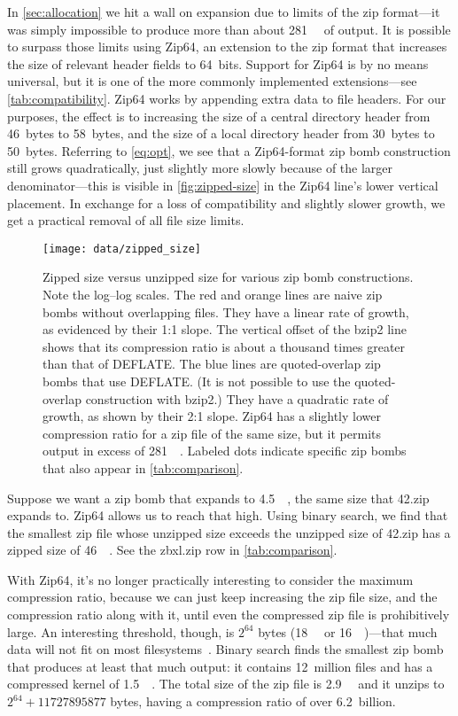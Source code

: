 \documentclass[letterpaper,twocolumn,10pt]{article}
\newcommand{\MB}{\mega\byte}
\newcommand{\GB}{\giga\byte}
\newcommand{\TB}{\tera\byte}
\newcommand{\PB}{\peta\byte}
\newcommand{\EB}{\exa\byte}
\newcommand{\EiB}{\exbi\byte}
\begin{document}
In \autoref{sec:allocation} we hit a wall on expansion
due to limits of the zip format---it was simply impossible
to produce more than about \SI{281}{\TB} of output.
It is possible to surpass those limits
using Zip64, an extension to the zip format that increases
the size of relevant header fields to 64~bits.
Support for Zip64 is by no means universal,
but it is one of the more commonly implemented extensions---see \autoref{tab:compatibility}.
Zip64 works by appending extra data to file headers.
For our purposes, the effect is to
increasing the size of a central directory header from
\SI{46}{bytes} to \SI{58}{bytes},
and the size of a local directory header from
\SI{30}{bytes} to \SI{50}{bytes}.
Referring to \autoref{eq:opt},
we see that a Zip64-format zip bomb construction
still grows quadratically,
just slightly more slowly because of the larger denominator---this
is visible in \autoref{fig:zipped-size} in the Zip64 line's
lower vertical placement.
In exchange for a loss of compatibility
and slightly slower growth,
we get a practical removal of all file size limits.

\begin{figure}
\texttt{[image: data/zipped\_size]}
\caption{
Zipped size versus unzipped size for various zip bomb constructions.
Note the log–log scales.
The red and orange lines are naive zip bombs without overlapping files.
They have a linear rate of growth,
as evidenced by their 1:1 slope.
The vertical offset of the bzip2 line shows that its compression ratio
is about a thousand times greater than that of DEFLATE.
The blue lines are quoted-overlap zip bombs that use DEFLATE.
(It is not possible to use the quoted-overlap construction with bzip2.)
They have a quadratic rate of growth,
as shown by their 2:1 slope.
Zip64 has a slightly lower compression ratio
for a zip file of the same size,
but it permits output in excess of \SI{281}{\TB}.
Labeled dots indicate specific zip bombs that
also appear in \autoref{tab:comparison}.
}
\label{fig:zipped-size}
\end{figure}

Suppose we want a zip bomb that expands to \SI{4.5}{\PB},
the same size that 42.zip expands to.
Zip64 allows us to reach that high.
Using binary search, we find that the smallest
zip file whose unzipped size exceeds the unzipped size of 42.zip
has a zipped size of \SI{46}{\MB}.
See the \mbox{zbxl.zip} row in \autoref{tab:comparison}.

With Zip64, it's no longer practically interesting to
consider the maximum compression ratio,
because we can just keep increasing the zip file size,
and the compression ratio along with it,
until even the compressed zip file is prohibitively large.
An interesting threshold, though,
is $2^{64}$ bytes
(\SI{18}{\EB} or \SI{16}{\EiB})---that
much data will not fit on most filesystems~\cite[\S Limits]{wiki-fs}.
Binary search finds the smallest zip bomb that produces at least that much output:
it contains 12~million files and has a compressed kernel of \SI{1.5}{\GB}.
The total size of the zip file is \SI{2.9}{\GB} and it unzips
to $2^{64}+\num{11727895877}$ bytes,
having a compression ratio of over 6.2~billion.
\end{document}
